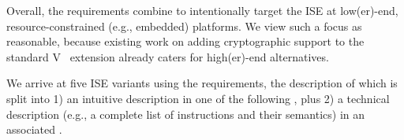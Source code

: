 \noindent
Overall, the requirements combine to intentionally target the ISE at 
 low(er)-end,
resource-constrained (e.g., embedded) platforms.  
We view such a focus as reasonable, because existing work on adding
cryptographic support to the
standard 
V~\cite[Section 21]{RV:ISA:I:19}
extension
already caters for
high(er)-end
alternatives.

We arrive at five ISE variants using the requirements, the description of 
which is split into
1) an 
   intuitive 
   description in one of the following \SEC[s],
   plus
2) a
   technical
   description
   (e.g., a complete list of instructions and their semantics)
   in an associated \APPX.

